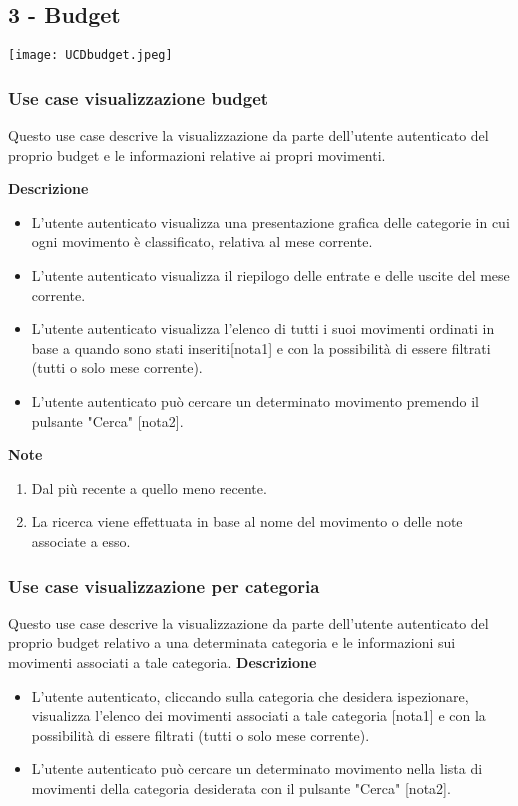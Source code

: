 \documentclass[a4paper,12pt]{article}
\begin{document}
\subsection*{3 - Budget}

\begin{center}
  \texttt{[image: UCDbudget.jpeg]}
\end{center}

\subsubsection*{Use case visualizzazione budget}

Questo use case descrive la visualizzazione da parte dell'utente autenticato del proprio budget e le informazioni relative ai propri movimenti.

\textbf{Descrizione}
\begin{itemize} \setlength\itemsep{0.01em}
\item L'utente autenticato visualizza una presentazione grafica delle categorie in cui ogni movimento è classificato, relativa al mese corrente.
\item L'utente autenticato visualizza il riepilogo delle entrate e delle uscite del mese corrente.
\item L'utente autenticato visualizza l'elenco di tutti i suoi movimenti ordinati in base a quando sono stati inseriti[nota1] e con la possibilità di essere filtrati (tutti o solo mese corrente).
\item L'utente autenticato può cercare un determinato movimento premendo il pulsante "Cerca" [nota2].
\end{itemize}

\textbf{Note}
\begin{enumerate} \setlength\itemsep{0.01em}
\item Dal più recente a quello meno recente.
\item La ricerca viene effettuata in base al nome del movimento o delle note associate a esso.
\end{enumerate}


\subsubsection*{Use case visualizzazione per categoria}

Questo use case descrive la visualizzazione da parte dell'utente autenticato del proprio budget relativo a una determinata categoria e le informazioni sui movimenti associati a tale categoria.
\textbf{Descrizione}
\begin{itemize} \setlength\itemsep{0.01em}
\item L'utente autenticato, cliccando sulla categoria che desidera ispezionare, visualizza l'elenco dei movimenti associati a tale categoria [nota1] e con la possibilità di essere filtrati (tutti o solo mese corrente).
\item L'utente autenticato può cercare un determinato movimento nella lista di movimenti della categoria desiderata con il pulsante "Cerca" [nota2].
\end{itemize}
\end{document}
